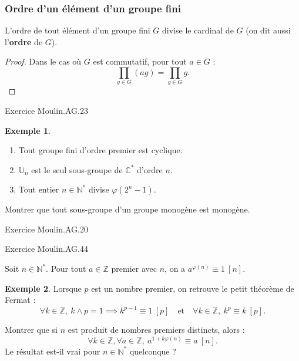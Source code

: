 \documentclass[french]{article}
\newcommand{\N}{\mathbb{N}}
\newcommand{\Z}{\mathbb{Z}}
\newcommand{\C}{\mathbb{C}}
\newcommand{\U}{\mathbb{U}}
\newcommand{\st}{^*}
\theoremstyle{plain}
\theoremstyle{definition}
\newtheorem*{ex}{Exemple}
\theoremstyle{remark}
\begin{document}
\subsubsection*{Ordre d'un élément d'un groupe fini}

\begin{thm}%
	L'ordre de tout élément d'un groupe fini $G$ divise le cardinal de $G$ (on dit aussi l'\textbf{ordre} de $G$).
\end{thm}
\begin{proof}
	Dans le cas où $G$ est commutatif, pour tout $a\in G$ :
	$$\prod_{g\in G}(ag)=\prod_{g\in G}g.$$
\end{proof}

Exercice Moulin.AG.23

\begin{ex}
	\begin{enumerate}
		\item Tout groupe fini d'ordre premier est cyclique.
		\item $\U_n$ est le seul sous-groupe de $\C\st$ d'ordre $n$.
		\item Tout entier $n\in\N\st$ divise $\varphi(2^n-1)$.
	\end{enumerate}
\end{ex}

\begin{exo}
	Montrer que tout sous-groupe d'un groupe monogène est monogène. %
\end{exo}

Exercice Moulin.AG.20

Exercice Moulin.AG.44

\begin{thm}%
	Soit $n\in\N\st$. Pour tout $a\in\Z$ premier avec $n$, on a $a^{\varphi(n)}\equiv 1\ [n]$.
\end{thm}

\begin{ex}
	Lorsque $p$ est un nombre premier, on retrouve le petit théorème de Fermat :
	$$\forall k\in\Z,\ k\wedge p=1\implies k^{p-1}\equiv 1\ [p]\quad\text{et}\quad \forall k\in\Z,\ k^p\equiv k\ [p].$$
\end{ex}

\begin{exo}
	Montrer que si $n$ est produit de nombres premiers distincts, alors : 
	$$\forall k\in\Z, \forall a\in\Z,\ a^{1+k\varphi(n)}\equiv a\ [n].$$
	Le résultat est-il vrai pour $n\in\N\st$ quelconque ?
\end{exo}
\end{document}
